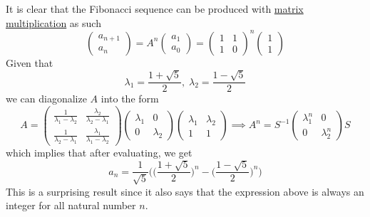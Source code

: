 	\begin{example}
	  \label{ex:fibonacci-sequence}
    It is clear that the Fibonacci sequence can be produced with \hyperref[def:matrix-multiplication]{matrix multiplication} as such 
		\begin{equation}
			\begin{pmatrix} a_{n+1} \\ a_n \end{pmatrix} = A^n \begin{pmatrix} a_1 \\ a_0 \end{pmatrix} = \begin{pmatrix} 1&1\\1&0 \end{pmatrix}^n \begin{pmatrix} 1\\1 \end{pmatrix}
		\end{equation}
    Given that 
		\begin{equation}
    	\lambda_1 = \frac{1+\sqrt{5}}{2}, \; \lambda_2 = \frac{1 - \sqrt{5}}{2}
		\end{equation}
    we can diagonalize $A$ into the form 
		\begin{equation}
			A = \begin{pmatrix}
				\frac{1}{\lambda_1 - \lambda_2} & \frac{\lambda_2}{\lambda_2 - \lambda_1} \\
				\frac{1}{\lambda_2 - \lambda_1} & \frac{\lambda_1}{\lambda_1 - \lambda_2}
				\end{pmatrix} \begin{pmatrix}
				\lambda_1 & 0 \\ 0 & \lambda_2 
				\end{pmatrix} \begin{pmatrix}
				\lambda_1 & \lambda_2 \\
				1 & 1
				\end{pmatrix} \implies A^n = S^{-1} \begin{pmatrix}
				\lambda_1^n & 0 \\ 0 & \lambda_2^n 
			\end{pmatrix} S
		\end{equation}
    which implies that after evaluating, we get 
		\begin{equation}
    	a_n = \frac{1}{\sqrt{5}} \bigg( \Big(\frac{1+\sqrt{5}}{2}\Big)^n - \Big(\frac{1-\sqrt{5}}{2}\Big)^n \bigg)
		\end{equation}
    This is a surprising result since it also says that the expression above is always an integer for all natural number $n$. 
  \end{example}


